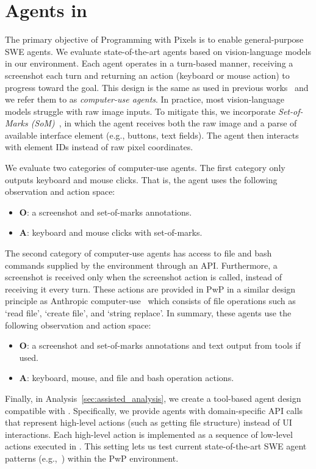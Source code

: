 
\section{Agents in \Ours{}}
\label{sec:agent}


The primary objective of Programming with Pixels is to enable general-purpose SWE agents.
We evaluate state-of-the-art agents based on vision-language models in our environment.
Each agent operates in a turn-based manner, receiving a screenshot each turn and returning an action (keyboard or mouse action) to progress toward the goal. This design is the same as used in previous works~\cite{xie2024osworldbenchmarkingmultimodalagents,koh2024visualwebarenaevaluatingmultimodalagents} and we refer them to as \textit{computer-use agents}.
In practice, most vision-language models struggle with raw image inputs.
To mitigate this, we incorporate \textit{Set-of-Marks (SoM)}~\cite{yang2023setofmarkpromptingunleashesextraordinary},
in which the agent receives both the raw image and a parse of available interface element (e.g., buttons, text fields).
The agent then interacts with element IDs instead of raw pixel coordinates.

We evaluate two categories of computer-use agents. The first category only outputs keyboard and mouse clicks.
That is, the agent uses the following observation and action space:
\begin{itemize}[leftmargin=*] 
    \item $\mathbf{O}$: a screenshot and set-of-marks annotations. 
    \item $\mathbf{A}$: keyboard and mouse clicks with set-of-marks.
\end{itemize}


The second category of computer-use agents has access to file and bash commands supplied by the environment through an API. Furthermore, a screenshot is received only when the screenshot action is called, instead of receiving it every turn. These actions are provided in PwP in a similar design principle as Anthropic computer-use~\cite{anthropic2024developing} which consists of file operations such as `read file', `create file', and `string replace'. 
In summary, these agents use the following observation and action space:
\begin{itemize}[leftmargin=*]
    \item \textbf{O}: a screenshot and set-of-marks annotations and text output from tools if used.
    \item \textbf{A}: keyboard, mouse, and file and bash operation actions.
\end{itemize}

Finally, 
in Analysis~\ref{sec:assisted_analysis}, we create a tool-based agent design compatible with \ours{}. 
Specifically, we provide agents with domain-specific API calls that represent high-level actions (such as getting file structure) instead of UI interactions.
Each high-level action is implemented as a sequence of low-level actions executed in \ours{}.     
This setting lets us test current state-of-the-art SWE agent patterns (e.g.,~\citet{wang2024openhandsopenplatformai}) within the PwP environment. 


